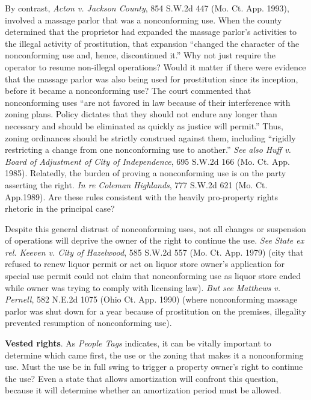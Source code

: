 By contrast, \textit{Acton v. Jackson County}, 854 S.W.2d 447 (Mo. Ct. App.
1993), involved a massage parlor that was a nonconforming use. When the county
determined that the proprietor had expanded the massage parlor's activities to
the illegal activity of prostitution, that expansion ``changed the character of
the nonconforming use and, hence, discontinued it.'' Why not just require the
operator to resume non-illegal operations? Would it matter if there were
evidence that the massage parlor was also being used for prostitution since its
inception, before it became a nonconforming use? The court commented that
nonconforming uses ``are not favored in law because of their interference with
zoning plans. Policy dictates that they should not endure any longer than
necessary and should be eliminated as quickly as justice will permit.'' Thus,
zoning ordinances should be strictly construed against them, including ``rigidly
restricting a change from one nonconforming use to another.'' \textit{See also}
\emph{Huff v. Board of Adjustment of City of Independence}, 695 S.W.2d 166 (Mo.
Ct. App. 1985). Relatedly, the burden of proving a nonconforming use is on the
party asserting the right. \emph{In re Coleman Highlands}, 777 S.W.2d 621 (Mo.
Ct. App.1989). Are these rules consistent with the heavily pro-property rights
rhetoric in the principal case?

\item
Despite this general distrust of nonconforming uses, not all changes or
suspension of operations will deprive the owner of the right to continue the
use. \textit{See} \emph{State ex rel. Keeven v. City of Hazelwood}, 585 S.W.2d
557 (Mo. Ct. App. 1979) (city that refused to renew liquor permit or act on
liquor store owner's application for special use permit could not claim that
nonconforming use as liquor store ended while owner was trying to comply with
licensing law). \textit{But see} \emph{Matthews v. Pernell}, 582 N.E.2d 1075
(Ohio Ct. App. 1990) (where nonconforming massage parlor was shut down for a
year because of prostitution on the premises, illegality prevented resumption of
nonconforming use).

\item
\textbf{Vested rights}. As \textit{People Tags} indicates, it can be vitally
important to determine which came first, the use or the zoning that makes it a
nonconforming use. Must the use be in full swing to trigger a property owner's
right to continue the use? Even a state that allows amortization will confront
this question, because it will determine whether an amortization period must be
allowed.


